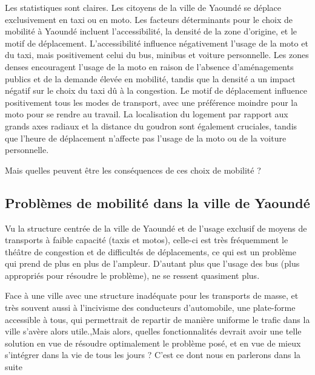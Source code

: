 Les statistiques sont claires. Les citoyens de la ville de Yaoundé se déplace exclusivement en taxi
 ou en moto. Les facteurs déterminants pour le choix de mobilité à Yaoundé incluent l’accessibilité, la densité de la zone d’origine, et le motif de déplacement. L’accessibilité influence négativement l’usage de la moto et du taxi, mais positivement celui du bus, minibus et voiture personnelle. Les zones denses encouragent l’usage de la moto en raison de l’absence d’aménagements publics et de la demande élevée en mobilité, tandis que la densité a un impact négatif sur le choix du taxi dû à la congestion. Le motif de déplacement influence positivement tous les modes de transport, avec une préférence moindre pour la moto pour se rendre au travail. La localisation du logement par rapport aux grands axes radiaux et la distance du goudron sont également cruciales, tandis que l’heure de déplacement n’affecte pas l’usage de la moto ou de la voiture personnelle.

 Mais quelles peuvent être les conséquences de ces choix de mobilité ?

 \subsection{Problèmes de mobilité dans la ville de Yaoundé}

Vu la structure centrée de la ville de Yaoundé et de l'usage exclusif de moyens de transports à faible capacité (taxis et motos), celle-ci est très fréquemment le théâtre de congestion et de difficultés de déplacements, ce qui est un problème qui prend de plus en plus de l'ampleur. D'autant plus que l'usage des bus (plus appropriés pour résoudre le problème), ne se ressent quasiment plus.

Face à une ville avec une structure inadéquate pour les transports de masse, et très souvent aussi à l'incivisme des conducteurs d'automobile, une plate-forme accessible à tous, qui permettrait de repartir de manière uniforme le trafic dans la ville s'avère alors utile.,Mais alors, quelles fonctionnalités devrait avoir une telle solution en vue de résoudre optimalement le problème posé, et en vue de mieux s'intégrer dans la vie de tous les jours ? C'est ce dont nous en parlerons dans la suite 




